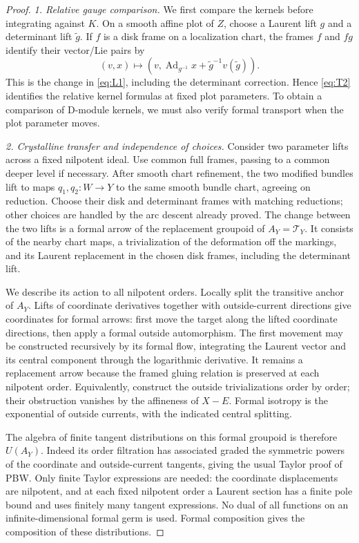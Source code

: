 \begin{proof}
\emph{1. Relative gauge comparison.}
We first compare the kernels before integrating against $K$.  On a
smooth affine plot of $Z$, choose a Laurent lift $g$ and a determinant
lift $\widetilde g$.  If $f$ is a disk frame on a localization chart,
the frames $f$ and $fg$ identify their vector/Lie pairs by
\begin{equation}\label{loc:gauge}
 (v,x)\longmapsto
 \left(v,\operatorname{Ad}_{g^{-1}}x+
                   \widetilde g^{-1}v(\widetilde g)\right).
\end{equation}
This is the change in \eqref{eq:L1}, including the determinant
correction.  Hence \eqref{eq:T2} identifies the relative kernel
formulas at fixed plot parameters.  To obtain a comparison of
D-module kernels, we must also verify formal transport when the plot
parameter moves.

\emph{2. Crystalline transfer and independence of choices.}
Consider two parameter lifts across a fixed nilpotent ideal.  Use
common full frames, passing to a common deeper level if necessary.
After smooth chart refinement, the two modified bundles lift to maps
$q_1,q_2:W\to Y$ to the same smooth bundle chart, agreeing on reduction.
Choose their disk and determinant frames with matching reductions;
other choices are handled by the arc descent already proved.  The
change between the two lifts is a formal arrow of the replacement
groupoid of $A_Y=\mathcal T_Y$.  It consists of the nearby chart maps,
a trivialization of the deformation off the markings, and its Laurent
replacement in the chosen disk frames, including the determinant lift.

We describe its action to all nilpotent orders.  Locally split the
transitive anchor of $A_Y$.  Lifts of coordinate derivatives together
with outside-current directions give coordinates for formal arrows:
first move the target along the lifted coordinate directions, then
apply a formal outside automorphism.  The first movement may be
constructed recursively by its formal flow, integrating the Laurent
vector and its central component through the logarithmic derivative.
It remains a replacement arrow because the framed gluing relation is
preserved at each nilpotent order.  Equivalently, construct the outside
trivializations order by order; their obstruction vanishes by the
affineness of $X-E$.  Formal isotropy is the exponential of outside
currents, with the indicated central splitting.

The algebra of finite tangent distributions on this formal groupoid
is therefore $U(A_Y)$.  Indeed its order filtration has associated
graded the symmetric powers of the coordinate and outside-current
tangents, giving the usual Taylor proof of PBW.  Only finite Taylor
expressions are needed: the coordinate displacements are nilpotent,
and at each fixed nilpotent order a Laurent section has a finite pole
bound and uses finitely many tangent expressions.  No dual of all
functions on an infinite-dimensional formal germ is used.  Formal
composition gives the composition of these distributions.


\end{proof}
